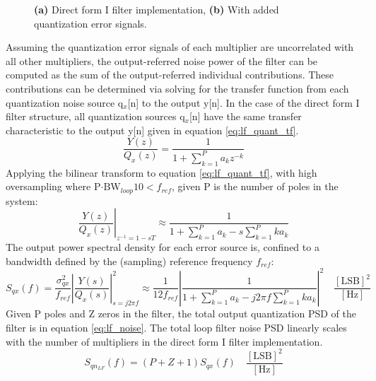 	\begin{figure}[htb!]
	    \centering
	    \begin{subfigure}{0.5\textwidth}
	        \centering
	        
	        \vspace{1.2em}
	        \caption{ }
	        \label{fig:direct_type_1_ideal}
	    \end{subfigure}%
	    \begin{subfigure}{0.5\textwidth}
	        \centering
	        
	        \caption{ }
	        \label{fig:direct_type_1_quant}
	    \end{subfigure}
	    \label{fig:direct_type_1}
	    \caption{\textbf{(a)} Direct form I filter implementation, \textbf{(b)} With added quantization error signals.}
	\end{figure}
	Assuming the quantization error signals of each multiplier are uncorrelated with all other multipliers, the output-referred noise power of the filter can be computed as the sum of the output-referred individual contributions. These contributions can be determined via solving for the transfer function from each quantization noise source q$_x$[n] to the output y[n]. In the case of the direct form I filter structure, all quantization sources q$_x$[n] have the same transfer characteristic to the output y[n] given in equation \ref{eq:lf_quant_tf}.
	\begin{equation}
		\frac{Y(z)}{Q_x(z)} = \frac{1}{1+\sum_{k=1}^P a_kz^{-k}}\label{eq:lf_quant_tf}
	\end{equation}
	Applying the bilinear transform to equation \ref{eq:lf_quant_tf}, with high oversampling where P$\cdot \text{BW}_{loop} 10 < f_{ref}$, given P is the number of poles in the system:
	\begin{equation}
		\left.\frac{Y(z)}{Q_x(z)}\right\vert_{z^{-1}=1-sT} \approx \frac{1}{1+\sum_{k=1}^P a_k - s\sum_{k=1}^P ka_k}\label{eq:lf_quant_tf_s}
	\end{equation}
	The output power spectral density for each error source is, confined to a bandwidth defined by the (sampling) reference frequency $f_{ref}$:
	\begin{equation}
		S_{qx}(f) = \frac{\sigma_{qx}^2}{f_{ref}}\left|\frac{Y(s)}{Q_x(s)}\right|^2_{s=j2\pi f} \approx \frac{1}{12f_{ref}}\left|\frac{1}{1+\sum_{k=1}^P a_k - j2\pi f\sum_{k=1}^P ka_k}\right|^2 \hspace{1em}\frac{[\text{LSB}]^2}{[\text{Hz}]}
	\end{equation}
	Given P poles and Z zeros in the filter, the total output quantization PSD of the filter is in equation \ref{eq:lf_noise}. The total loop filter noise PSD linearly scales with the number of multipliers in the direct form I filter implementation.
	\begin{equation}
		S_{qn_{LF}}(f) = (P+Z+1)S_{qx}(f) \hspace{1em}\frac{[\text{LSB}]^2}{[\text{Hz}]}\label{eq:lf_noise}
	\end{equation}

